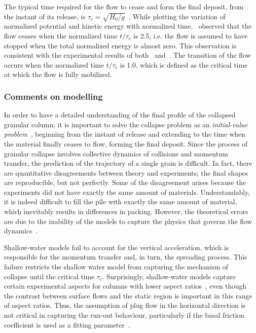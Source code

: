 The typical time required for the flow to cease and form the final 
deposit, from the instant of its release, is 
$\tau_c=\sqrt{\textit{H}_{\textit{0}}/\textit{g}}$~\citep{Staron2007a}. 
While plotting the variation of normalized potential and kinetic energy with 
normalized time,~\citet{Staron2007a} observed that the flow ceases when the 
normalized time $\textit{t}/\tau_c$ is 2.5, i.e. the flow is assumed to 
have stopped when the total normalized energy is almost zero. This observation 
is consistent with the experimental results of both~\citet{Lube2005} 
and~\citet{Lajeunesse2005}. The transition of the flow occurs when the 
normalized time $\textit{t}/\tau_c$ is 1.0, which is defined as the critical 
time at which the flow is fully mobilized.

\subsubsection{Comments on modelling}

In order to have a detailed understanding of the final profile of the collapsed 
granular column, it is important to solve the collapse problem as an 
\textit{initial-value problem}~\citep{Balmforth2005}, beginning from the 
instant of release and extending to the time when the material finally ceases 
to flow, forming the final deposit. Since the process of granular collapse 
involves collective dynamics of collisions and momentum transfer, the 
prediction of the trajectory of a single grain is difficult. In fact, there are 
quantitative disagreements between theory and experiments; the final shapes are 
reproducible, but not perfectly. Some of the disagreement arises because the 
experiments did not have exactly the same amount of materials. Understandably, 
it is indeed 
difficult to fill the pile with exactly the same amount of material, which 
inevitably
results in differences in packing. However, the theoretical errors are due to 
the inability of the models to capture the physics that governs the flow 
dynamics~\citep{Balmforth2005}. 

Shallow-water models fail to account for the 
vertical acceleration, which is responsible for the momentum transfer and, in 
turn, the spreading process. This failure restricts the shallow water model 
from capturing the mechanism of collapse until the critical time 
$\tau_{\textit{c}}$. 
Surprisingly, shallow-water models capture certain experimental aspects for 
columns with lower aspect 
ratios~\citep{Mangeney2010,Balmforth2005,Kerswell2005}, even though the 
contrast between surface flows and the static region is important in this range 
of aspect ratios. Thus, the assumption of plug flow in the horizontal direction 
is not critical in capturing the run-out behaviour, particularly if the basal 
friction coefficient is used as a fitting parameter~\citep{Lajeunesse2005}. 

